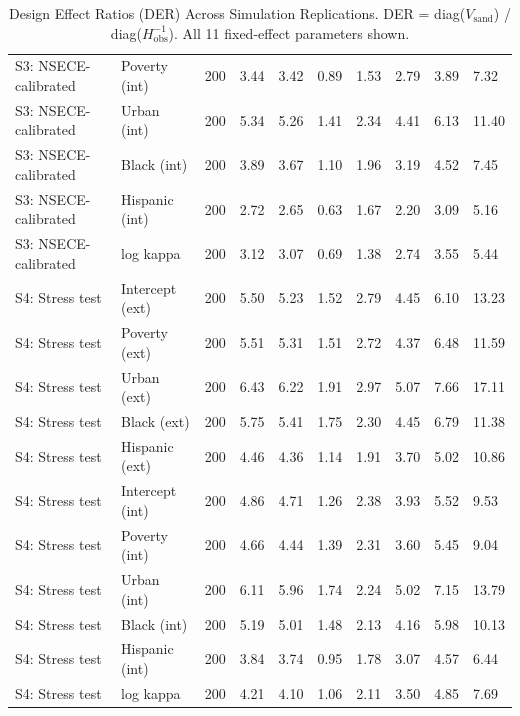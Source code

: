 \begin{table}[htbp]
\begin{tabular}{llrlllllll}
  S3: NSECE-calibrated & Poverty (int) & 200 & 3.44 & 3.42 & 0.89 & 1.53 & 2.79 & 3.89 & 7.32 \\ 
  S3: NSECE-calibrated & Urban (int) & 200 & 5.34 & 5.26 & 1.41 & 2.34 & 4.41 & 6.13 & 11.40 \\ 
  S3: NSECE-calibrated & Black (int) & 200 & 3.89 & 3.67 & 1.10 & 1.96 & 3.19 & 4.52 & 7.45 \\ 
  S3: NSECE-calibrated & Hispanic (int) & 200 & 2.72 & 2.65 & 0.63 & 1.67 & 2.20 & 3.09 & 5.16 \\ 
  S3: NSECE-calibrated & log kappa & 200 & 3.12 & 3.07 & 0.69 & 1.38 & 2.74 & 3.55 & 5.44 \\ 
  S4: Stress test & Intercept (ext) & 200 & 5.50 & 5.23 & 1.52 & 2.79 & 4.45 & 6.10 & 13.23 \\ 
  S4: Stress test & Poverty (ext) & 200 & 5.51 & 5.31 & 1.51 & 2.72 & 4.37 & 6.48 & 11.59 \\ 
  S4: Stress test & Urban (ext) & 200 & 6.43 & 6.22 & 1.91 & 2.97 & 5.07 & 7.66 & 17.11 \\ 
  S4: Stress test & Black (ext) & 200 & 5.75 & 5.41 & 1.75 & 2.30 & 4.45 & 6.79 & 11.38 \\ 
  S4: Stress test & Hispanic (ext) & 200 & 4.46 & 4.36 & 1.14 & 1.91 & 3.70 & 5.02 & 10.86 \\ 
  S4: Stress test & Intercept (int) & 200 & 4.86 & 4.71 & 1.26 & 2.38 & 3.93 & 5.52 & 9.53 \\ 
  S4: Stress test & Poverty (int) & 200 & 4.66 & 4.44 & 1.39 & 2.31 & 3.60 & 5.45 & 9.04 \\ 
  S4: Stress test & Urban (int) & 200 & 6.11 & 5.96 & 1.74 & 2.24 & 5.02 & 7.15 & 13.79 \\ 
  S4: Stress test & Black (int) & 200 & 5.19 & 5.01 & 1.48 & 2.13 & 4.16 & 5.98 & 10.13 \\ 
  S4: Stress test & Hispanic (int) & 200 & 3.84 & 3.74 & 0.95 & 1.78 & 3.07 & 4.57 & 6.44 \\ 
  S4: Stress test & log kappa & 200 & 4.21 & 4.10 & 1.06 & 2.11 & 3.50 & 4.85 & 7.69 \\ 
   \bottomrule
\end{tabular}
\caption{Design Effect Ratios (DER) Across Simulation Replications. DER = diag($V_{\text{sand}}$) / diag($H_{\text{obs}}^{-1}$). All 11 fixed-effect parameters shown.} 
\end{table}
